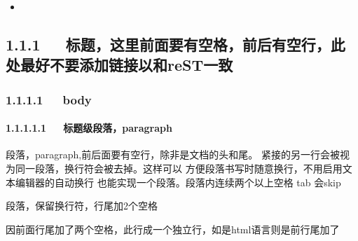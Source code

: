 \documentclass[letterpaper,12pt,english]{sphinxmanual}
\begin{document}
\begin{sphinxShadowBox}
\begin{itemize}
\begin{itemize}
\begin{itemize}
\begin{itemize}
\begin{itemize}
\end{itemize}

\item {} 
\label{\detokenize{001software/001install/001._u7f51_u7ad9/demo-markdown:id12}}{\hyperref[\detokenize{001software/001install/001._u7f51_u7ad9/demo-markdown:id4}]{}}

\end{itemize}

\end{itemize}

\end{itemize}

\end{itemize}
\end{sphinxShadowBox}


\subsection{1.1.1   标题，这里前面要有空格，前后有空行，此处最好不要添加链接以和reST一致}
\label{\detokenize{001software/001install/001._u7f51_u7ad9/demo-markdown:rest}}

\subsubsection{1.1.1.1   body}
\label{\detokenize{001software/001install/001._u7f51_u7ad9/demo-markdown:body}}

\paragraph{1.1.1.1.1   标题级段落，paragraph}
\label{\detokenize{001software/001install/001._u7f51_u7ad9/demo-markdown:paragraph}}
段落，paragraph,前后面要有空行，除非是文档的头和尾。
紧接的另一行会被视为同一段落，换行符会被去掉。这样可以
方便段落书写时随意换行，不用启用文本编辑器的自动换行
也能实现一个段落。段落内连续两个以上空格 tab 会skip

\begin{DUlineblock}{0em}
\item[] 段落，保留换行符，行尾加2个空格
\item[] 因前面行尾加了两个空格，此行成一个独立行，如是html语言则是前行尾加了
\end{DUlineblock}
\end{document}
